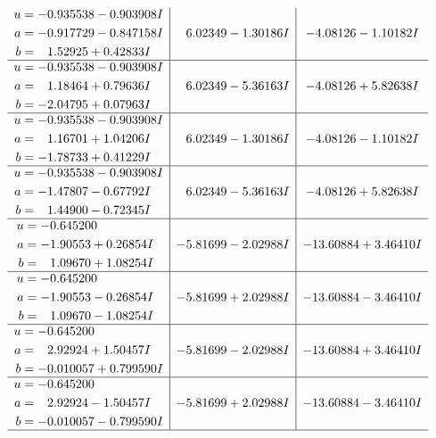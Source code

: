 \documentclass[1p]{elsarticle_modified}
\theoremstyle{definition}
\begin{document}
$$\begin{array}{c|c|c}
\begin{aligned}
u &= -0.935538 - 0.903908 I \\
a &= -0.917729 - 0.847158 I \\
b &= \phantom{-}1.52925 + 0.42833 I\end{aligned}
 & \phantom{-}6.02349 - 1.30186 I & -4.08126 - 1.10182 I \\ \hline\begin{aligned}
u &= -0.935538 - 0.903908 I \\
a &= \phantom{-}1.18464 + 0.79636 I \\
b &= -2.04795 + 0.07963 I\end{aligned}
 & \phantom{-}6.02349 - 5.36163 I & -4.08126 + 5.82638 I \\ \hline\begin{aligned}
u &= -0.935538 - 0.903908 I \\
a &= \phantom{-}1.16701 + 1.04206 I \\
b &= -1.78733 + 0.41229 I\end{aligned}
 & \phantom{-}6.02349 - 1.30186 I & -4.08126 - 1.10182 I \\ \hline\begin{aligned}
u &= -0.935538 - 0.903908 I \\
a &= -1.47807 - 0.67792 I \\
b &= \phantom{-}1.44900 - 0.72345 I\end{aligned}
 & \phantom{-}6.02349 - 5.36163 I & -4.08126 + 5.82638 I \\ \hline\begin{aligned}
u &= -0.645200\phantom{ +0.000000I} \\
a &= -1.90553 + 0.26854 I \\
b &= \phantom{-}1.09670 + 1.08254 I\end{aligned}
 & -5.81699 - 2.02988 I & -13.60884 + 3.46410 I \\ \hline\begin{aligned}
u &= -0.645200\phantom{ +0.000000I} \\
a &= -1.90553 - 0.26854 I \\
b &= \phantom{-}1.09670 - 1.08254 I\end{aligned}
 & -5.81699 + 2.02988 I & -13.60884 - 3.46410 I \\ \hline\begin{aligned}
u &= -0.645200\phantom{ +0.000000I} \\
a &= \phantom{-}2.92924 + 1.50457 I \\
b &= -0.010057 + 0.799590 I\end{aligned}
 & -5.81699 - 2.02988 I & -13.60884 + 3.46410 I \\ \hline\begin{aligned}
u &= -0.645200\phantom{ +0.000000I} \\
a &= \phantom{-}2.92924 - 1.50457 I \\
b &= -0.010057 - 0.799590 I\end{aligned}
 & -5.81699 + 2.02988 I & -13.60884 - 3.46410 I\\
 \hline 
 \end{array}$$\newpage\newpage\renewcommand{\arraystretch}{1}
\end{document}
